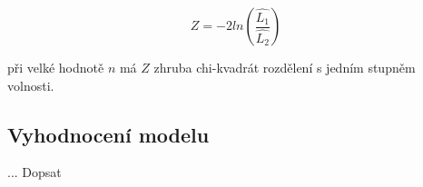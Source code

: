 \begin{equation}
    Z = -2ln(\frac{\hat{L_1}}{\hat{L_2}})
\end{equation}

při velké hodnotě $n$ má $Z$ zhruba chi-kvadrát rozdělení s jedním stupněm volnosti.

\subsection{Vyhodnocení modelu}
... Dopsat